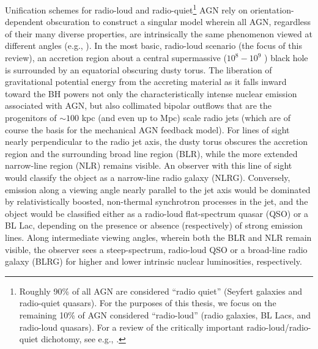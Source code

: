Unification schemes for radio-loud and radio-quiet\footnote{Roughly 90\% of all AGN are considered 
``radio quiet'' (Seyfert galaxies and radio-quiet quasars). For the purposes of this thesis, 
we focus on the remaining 10\% of AGN considered ``radio-loud'' (radio galaxies, 
BL Lacs, and radio-loud quasars). For a review of the critically important radio-loud/radio-quiet dichotomy, see e.g., \citet{capetti10}.} AGN rely on   orientation-dependent obscuration to construct a singular model wherein all AGN, regardless of their many diverse properties, are intrinsically the same phenomenon viewed at different angles (e.g., \citealt{barthel89,antonucci93,urry95}).
In the  most basic, radio-loud scenario (the focus of this review),  an
accretion  region   about  a  central  supermassive   ($10^8  -  10^9$
\Msol) black  hole is  surrounded by an  equatorial obscuring
dusty torus. 
 The liberation  of  gravitational potential  energy from  the
accreting material  as it falls inward  toward the BH  powers not only
the characteristically  intense nuclear emission  associated with AGN,
but  also collimated  bipolar  outflows that  are  the progenitors  of $\sim100$  kpc (and  even  up to  Mpc)  scale radio  jets (which 
are of course the basis for the mechanical AGN feedback model). 
For lines of sight nearly  perpendicular to the radio jet axis, the 
dusty torus obscures the accretion region and the surrounding broad line 
region (BLR), while the more extended narrow-line region (NLR) remains visible. 
An observer 
with this line of sight would classify the object as a narrow-line radio galaxy (NLRG). 
Conversely, emission along a viewing angle nearly parallel to the jet axis 
would be dominated by relativistically boosted, non-thermal synchrotron processes in the jet,
and the object would be classified either as a radio-loud flat-spectrum quasar (QSO)  
or a BL Lac, depending on the presence or absence (respectively) of strong emission 
lines. Along intermediate viewing angles, wherein both the BLR and NLR remain visible, 
the observer sees a steep-spectrum, radio-loud QSO or a broad-line radio galaxy (BLRG) for higher 
and lower intrinsic nuclear luminosities, respectively. 



